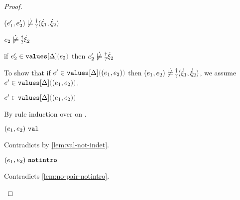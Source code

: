 \begin{proof}
\begin{byCases}
\begin{byCases}
\begin{byCases}
\begin{byCases}
\begin{byCases}
\begin{byCases}
\begin{pfsteps*}
              \item $\cnotsatisfyormay{\hpair{e_1'}{e_2'}}{\cpair{\hxi_1}{\hxi_2}}$ 
              \end{pfsteps*} 
            \end{byCases}
            \item[\cnotsatisfyormay{e_2}{\hxi_2}]
            \begin{pfsteps*}
            \item $\cnotsatisfyormay{e_2}{\hxi_2}$  
            \item if $\inValues{e_2'}{\Delta}{e_2}$ then $\cnotsatisfyormay{e_2'}{\hxi_2}$  
            \end{pfsteps*}
            To show that if $\inValues{e'}{\Delta}{\hpair{e_1}{e_2}}$ then $\cnotsatisfyormay{\hpair{e_1}{e_2}}{\cpair{\hxi_1}{\hxi_2}}$, we assume $\inValues{e'}{\Delta}{\hpair{e_1}{e_2}}$.
            \begin{pfsteps*}
            \item $\inValues{e'}{\Delta}{\hpair{e_1}{e_2}}$  
            \end{pfsteps*}
            By rule induction over  on .
            \begin{byCases}
              \item[\text{(\ref{rule:IVVal})}]
              \begin{pfsteps*}
              \item $(e_1 , e_2) ~\mathtt{val}$ 
              \end{pfsteps*} 
              Contradicts  by \autoref{lem:val-not-indet}.
              \item[\text{(\ref{rule:IVIndet})}] 
              \begin{pfsteps*}
              \item $(e_1 , e_2) ~\mathtt{notintro}$ 
              \end{pfsteps*}
              Contradicts \autoref{lem:no-pair-notintro}.
              \item[\text{(\ref{rule:IVPair})}]

\end{byCases}
\end{byCases}
\end{byCases}
\end{byCases}
\end{byCases}
\end{byCases}
\end{proof}
